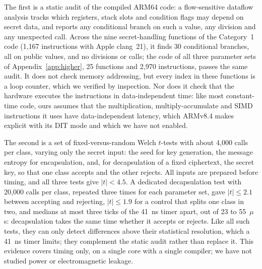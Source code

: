 \documentclass[11pt,a4paper]{article}
\theoremstyle{definition}
\begin{document}
The first is a static audit of the compiled ARM64 code: a flow-sensitive dataflow analysis tracks which registers, stack slots and condition flags may depend on secret data, and reports any conditional branch on such a value, any division and any unexpected call. Across the nine secret-handling functions of the Category~1 code (1{,}167 instructions with Apple clang~21), it finds 30 conditional branches, all on public values, and no divisions or calls; the code of all three parameter sets of Appendix~\ref{app:higher}, 25 functions and 2{,}970 instructions, passes the same audit. It does not check memory addressing, but every index in these functions is a loop counter, which we verified by inspection. Nor does it check that the hardware executes the instructions in data-independent time: like most constant-time code, ours assumes that the multiplication, multiply-accumulate and SIMD instructions it uses have data-independent latency, which ARMv8.4 makes explicit with its DIT mode and which we have not enabled.

The second is a set of fixed-versus-random Welch $t$-tests with about 4{,}000 calls per class, varying only the secret input: the seed for key generation, the message entropy for encapsulation, and, for decapsulation of a fixed ciphertext, the secret key, so that one class accepts and the other rejects. All inputs are prepared before timing, and all three tests give $|t| < 4.5$. A dedicated decapsulation test with 20{,}000 calls per class, repeated three times for each parameter set, gave $|t| \le 2.1$ between accepting and rejecting, $|t| \le 1.9$ for a control that splits one class in two, and medians at most three ticks of the 41~ns timer apart, out of 23 to 55~$\mu$s: decapsulation takes the same time whether it accepts or rejects. Like all such tests, they can only detect differences above their statistical resolution, which a 41~ns timer limits; they complement the static audit rather than replace it. This evidence covers timing only, on a single core with a single compiler; we have not studied power or electromagnetic leakage.
\end{document}
